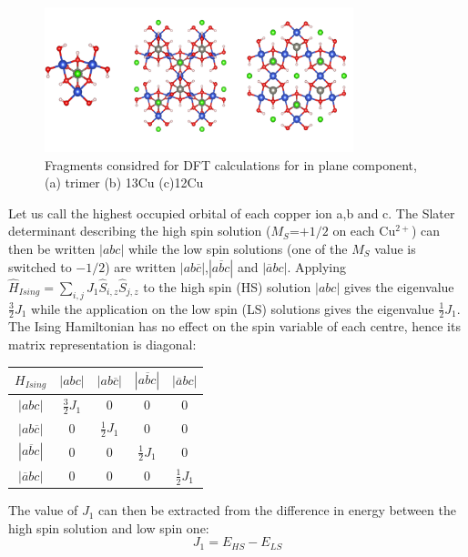 \documentclass[10pt]{report}
\numberwithin{equation}{section}
\begin{document}
\begin{figure}[h!]
    \centering
    \includegraphics[width=0.8\textwidth]{Images/FragmentDFT_plan.png}
    \caption{Fragments considred for DFT calculations for in plane component, (a) trimer (b) 13Cu (c)12Cu}
    \label{FragmentDFT}
\end{figure}

Let us call the highest occupied orbital of each copper ion a,b and c. 
The Slater determinant describing the high spin solution ($M_S$=$+1/2$ on each Cu$^{2+}$) can then be written $|abc|$ while the low spin solutions (one of the $M_S$ value is switched to $-1/2$) are written $|ab\overline{c}|$,$|a\overline{b}c|$ and $|\overline{a}bc|$.
Applying $\hat{H}_{Ising}=\sum_{i,j}J_1 \hat{S}_{i,z}\hat{S}_{j,z}$ to the high spin (HS) solution $|abc|$ gives the eigenvalue $\frac{3}{2}J_1$ while the application on the low spin (LS) solutions gives the eigenvalue $\frac{1}{2}J_1$. 
The Ising Hamiltonian has no effect on the spin variable of each centre, hence its matrix representation is diagonal:

\begin{center}
    \begin{tabular}{c | c c c c}
        $H_{Ising}$ & $|abc|$ & $|ab\overline{c}|$&$|a\overline{b}c|$ & $|\overline{a}bc|$\\
        \hline
        $|abc|$ & $\frac{3}{2}J_1$ & 0 & 0 & 0\\
        $|ab\overline{c}|$ & 0 & $\frac{1}{2}J_1 $& 0 & 0\\
        $|a\overline{b}c|$ & 0 & 0 & $\frac{1}{2}J_1 $ & 0 \\
        $|\overline{a}bc|$ & 0 & 0 & 0 & $\frac{1}{2}J_1 $
    \end{tabular}
\end{center}

The value of $J_1$ can then be extracted from the difference in energy between the high spin solution and low spin one:
\begin{equation}
    J_1=E_{HS}-E_{LS}
\end{equation}
\end{document}

